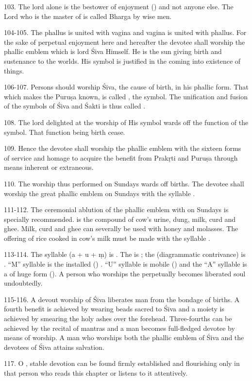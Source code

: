 103. The lord alone is the bestower of enjoyment () and not anyone
else. The Lord who is the master of  is called Bharga by wise men.

104-105. The phallus is united with vagina and vagina is united with phallus.
For the sake of perpetual enjoyment here and hereafter the devotee shall worship
the phallic emblem which is lord Śiva Himself. He is the sun giving birth and
sustenance to the worlds. His symbol is justified in the coming into existence
of things.

106-107. Persons should worship Śiva, the cause of birth, in his phallic form.
That which makes the Puruṣa known, is called , the symbol.
The unification and fusion of the symbols of Śiva and Śakti is thus called
.

108. The lord delighted at the worship of His symbol wards off the function of
the symbol. That function being birth \etc cease.

109. Hence the devotee shall worship the phallic emblem with the sixteen forms
of service and homage to acquire the benefit from Prakṛti and Puruṣa through
means inherent or extraneous.

110. The worship thus performed on Sundays wards off births. The devotee shall
worship the great phallic emblem on Sundays with the syllable .

111-112. The ceremonial ablution of the phallic emblem with  on
Sundays is specially recommended.  is the compound of cow’s urine,
dung, milk, curd and ghee. Milk, curd and ghee can severally be used with honey
and molasses. The offering of rice cooked in cow’s milk must be made with
the syllable .

113-114. The syllable  (a + u + ṃ) is .
The  is ; the  (diagrammatic
contrivance) is . “M” syllable is the installed
() . “U” syllable is mobile ()  and
the “A” syllable is a  of huge form (). A person who
worships the  perpetually becomes liberated soul undoubtedly.

115-116. A devout worship of Śiva liberates man from the bondage of births.
A fourth benefit is achieved by wearing  beads sacred to Śiva and
a moiety is achieved by smearing the holy ashes over the forehead. Three-fourths
can be achieved by the recital of mantras and a man becomes full-fledged devotee
by means of worship. A man who worships both the phallic emblem of Śiva and
the devotees of Śiva attains salvation.

117. O , stable devotion can be found firmly established and
flourishing only in that person who reads this chapter or listens to it
attentively.
